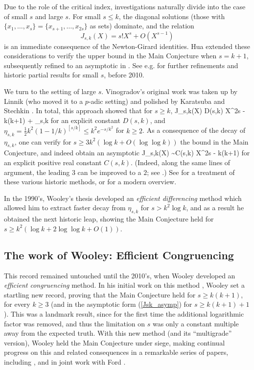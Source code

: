 \documentclass[brochure,english,12pt]{bourbaki}%
\begin{document}
Due to the role of the critical index, investigations naturally divide into the case of small $s$ and large $s$. For small $s \leq k$, the diagonal solutions (those with $\{x_1, \ldots, x_s\} = \{x_{s+1}, \ldots, x_{2s}\}$ as sets) dominate, and the relation 
\[J_{s,k}(X) = s! X^s + O(X^{s-1})\]
 is an immediate consequence of the Newton-Girard identities. Hua \cite{Hua47} extended these considerations to verify the upper bound in the Main Conjecture when $s=k+1$, subsequently refined to an asymptotic in \cite{VauWoo95}.  See e.g. \cite[\S 3]{Woo14b} for further refinements and historic partial results for small $s$, before 2010.

We turn to the setting of large $s$.
 Vinogradov's  original work \cite{Vin35} was taken up by Linnik \cite{Lin43}  (who moved it to a $p$-adic setting) and polished by Karatsuba \cite{Kar73} and Stechkin \cite{Ste75}.
In total, this approach showed that for $s \geq k$, 
 \beq\label{Jsk_classical}
  J_{s,k}(X) \leq D(s,k) X^{2s -  k(k+1) + \eta_{s,k}} 
  \eeq
 for an explicit constant $D(s,k)$, and $\eta_{s,k} = \frac{1}{2}k^2 (1-1/k)^{[s/k]} \leq k^2 e^{-s/k^2}$ for $k \geq 2$. As a consequence of the decay of $\eta_{s,k}$,  one can verify  for $s \geq 3k^2 (\log k + O(\log \log k))$ the bound in the Main Conjecture, and indeed obtain an asymptotic 
 \beq\label{Jsk_asymp}
  J_{s,k}(X) \sim C(s,k) X^{2s - k(k+1)} 
  \eeq
 for an explicit positive real constant $C(s,k)$.
 (Indeed, along the same lines of argument, the leading $3$ can be improved to a $2$; see \cite[Thm. 3.9]{ACK04}.)
 See \cite[Ch. 3]{ACK04} for a treatment of these various historic methods, or \cite[Ch. 7]{Vau97} for a modern overview.

In the 1990's, Wooley's thesis \cite{Woo92,Woo96} developed an \emph{efficient differencing} method which allowed him to extract faster decay from $\eta_{s,k}$ for $s > k^2 \log k$, and as a result he obtained the next historic leap, showing  the Main Conjecture held for $s \geq k^2 (\log k + 2 \log \log k +O(1))$.  
 




\subsection{The work of Wooley: Efficient Congruencing}
This record remained untouched until the 2010's, when Wooley developed an \emph{efficient congruencing} method. In his initial work on this method \cite{Woo12a}, Wooley set a startling new record, proving that the Main Conjecture held for $s \geq k(k+1)$, for every $ k \geq 3$ (and in the asymptotic form (\ref{Jsk_asymp}) for $s \geq k(k+1)+1$).  This was a landmark result, since for the first time the additional logarithmic factor was removed, and thus the limitation on $s$ was only a constant multiple away from the expected truth.
 With this new method (and its ``multigrade'' version), Wooley  held the Main Conjecture under siege, making continual progress on this and related consequences in a remarkable series of papers, including \cite{Woo12b, Woo13b,Woo14b,Woo15a,Woo15b,Woo16c,Woo16a,Woo16b,Woo17b,Woo17a}, and in joint work with Ford \cite{ForWoo14}.
 
\end{document}
